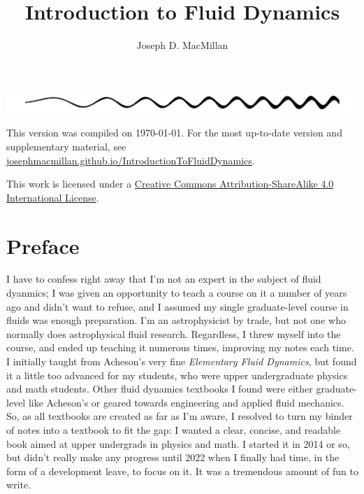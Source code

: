 \documentclass[10pt, a5paper, twoside, openany]{memoir}
\title{Introduction to Fluid Dynamics}
\author{Joseph D. MacMillan}
\date{}
\begin{document}
\frontmatter

\maketitle

\begin{center}

\includegraphics[width=\linewidth]{Figures/fig_cover_wave}

\vspace{1in}

{\small

This version was compiled on \today.  For the most up-to-date version and supplementary material, see \href{https://josephmacmillan.github.io/IntroductionToFluidDynamics/index.html}{josephmacmillan.github.io/IntroductionToFluidDynamics}.

\vspace{2in}

This work is licensed under a \href{https://creativecommons.org/licenses/by-sa/4.0/}{Creative Commons Attribution-ShareAlike 4.0 International License}.
}
\end{center}


\newpage

\tableofcontents

\chapter{Preface}

I have to confess right away that I'm not an expert in the subject of fluid dyanmics; I was given an opportunity to teach a course on it a number of years ago and didn't want to refuse, and I assumed my single graduate-level course in fluids was enough preparation.  I'm an astrophysicist by trade, but not one who normally does astrophysical fluid research.  Regardless, I threw myself into the course, and ended up teaching it numerous times, improving my notes each time.  I initially taught from Acheson's very fine \emph{Elementary Fluid Dynamics}, but found it a little too advanced for my students, who were upper undergraduate physics and math students.  Other fluid dynamics textbooks I found were either graduate-level like Acheson's or geared towards engineering and applied fluid mechanics.  So, as all textbooks are created as far as I'm aware, I resolved to turn my binder of notes into a textbook to fit the gap: I wanted a clear, concise, and readable book aimed at upper undergrads in physics and math.  I started it in 2014 or so, but didn't really make any progress until 2022 when I finally had time, in the form of a development leave, to focus on it.  It was a tremendous amount of fun to write.
\end{document}
